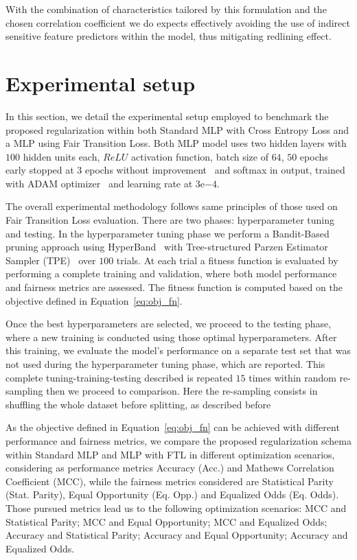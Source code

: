 With the combination of characteristics tailored by this formulation and the chosen correlation coefficient we do expects effectively avoiding the use of indirect sensitive feature predictors within the model, thus mitigating redlining effect.

\section{Experimental setup} \label{sec:rpr_experimental}

In this section, we detail the experimental setup employed to benchmark the proposed regularization within both Standard MLP with Cross Entropy Loss and a MLP using Fair Transition Loss. Both MLP model uses two hidden layers with $100$ hidden units each, $ReLU$ activation function, batch size of $64$, $50$ epochs early stopped at $3$ epochs without improvement~\citep{Li2020} and softmax in output, trained with ADAM optimizer~\citep{KingmaB14} and learning rate at $3\mathrm{e}{-4}$. 

The overall experimental methodology follows same principles of those used on Fair Transition Loss evaluation. There are two phases: hyperparameter tuning and testing. In the hyperparameter tuning phase we perform a Bandit-Based pruning approach using HyperBand~\citep{Li2018} with Tree-structured Parzen Estimator Sampler (TPE)~\citep{bergstra2011} over $100$ trials. At each trial a fitness function is evaluated by performing a complete training and validation, where both model performance and fairness metrics are assessed. The fitness function is computed based on the objective defined in Equation~\ref{eq:obj_fn}. 

Once the best hyperparameters are selected, we proceed to the testing phase, where a new training is conducted using those optimal hyperparameters. After this training, we evaluate the model's performance on a separate test set that was not used during the hyperparameter tuning phase, which are reported. This complete tuning-training-testing described is repeated $15$ times within random re-sampling then we proceed to comparison. Here the re-sampling consists in shuffling the whole dataset before splitting, as described before

As the objective defined in Equation~\ref{eq:obj_fn} can be achieved with different performance and fairness metrics, we compare the proposed regularization schema within Standard MLP and MLP with FTL in different optimization scenarios, considering as performance metrics Accuracy (Acc.) and Mathews Correlation Coefficient (MCC), while the fairness metrics considered are Statistical Parity (Stat. Parity), Equal Opportunity (Eq. Opp.) and Equalized Odds (Eq. Odds). Those pursued metrics lead us to the following optimization scenarios: MCC and Statistical Parity; MCC and Equal Opportunity; MCC and Equalized Odds; Accuracy and Statistical Parity; Accuracy and Equal Opportunity; Accuracy and Equalized Odds.

